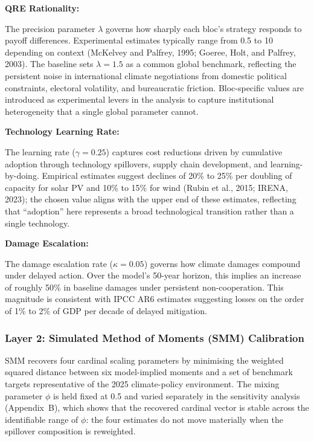 \documentclass[10pt,a4paper]{article}
\newcommand{\bpar}[1]{%
  \par\addvspace{\medskipamount}%
  \needspace{4\baselineskip}%
  \noindent\textbf{#1}\par\nopagebreak[4]%
}
\begin{document}
\needspace{5em}
\bpar{QRE Rationality:}
The precision parameter $\lambda$ governs how sharply each bloc's strategy responds to payoff differences. Experimental estimates typically range from 0.5 to 10 depending on context (McKelvey and Palfrey, 1995; Goeree, Holt, and Palfrey, 2003). The baseline sets $\lambda = 1.5$ as a common global benchmark, reflecting the persistent noise in international climate negotiations from domestic political constraints, electoral volatility, and bureaucratic friction. Bloc-specific values are introduced as experimental levers in the analysis to capture institutional heterogeneity that a single global parameter cannot.

\bpar{Technology Learning Rate:}
The learning rate ($\gamma = 0.25$) captures cost reductions driven by cumulative adoption through technology spillovers, supply chain development, and learning-by-doing. Empirical estimates suggest declines of 20\% to 25\% per doubling of capacity for solar PV and 10\% to 15\% for wind (Rubin et al., 2015; IRENA, 2023); the chosen value aligns with the upper end of these estimates, reflecting that ``adoption'' here represents a broad technological transition rather than a single technology.

\bpar{Damage Escalation:}
The damage escalation rate ($\kappa = 0.05$) governs how climate damages compound under delayed action.
Over the model's 50-year horizon, this implies an increase of roughly 50\% in baseline damages under
persistent non-cooperation. This magnitude is consistent with IPCC AR6 estimates suggesting losses on
the order of 1\% to 2\% of GDP per decade of delayed mitigation.

\needspace{12em}
\subsubsection{Layer 2: Simulated Method of Moments (SMM) Calibration}

SMM recovers four cardinal scaling parameters by minimising the weighted squared distance between six model-implied moments and a set of benchmark targets representative of the 2025 climate-policy environment. The mixing parameter $\phi$ is held fixed at 0.5 and varied separately in the sensitivity analysis (Appendix~B), which shows that the recovered cardinal vector is stable across the identifiable range of $\phi$: the four estimates do not move materially when the spillover composition is reweighted.
\end{document}
